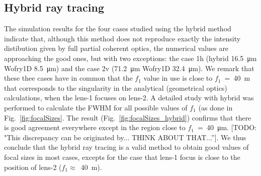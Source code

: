 \documentclass{iucr}              %
\newcommand{\todo}[1]{{\color{red}[TODO: "#1'']}}
\begin{document}
\subsection{Hybrid ray tracing}

The simulation results for the four cases studied using the hybrid method indicate that, although this method does not reproduce exactly the intensity distibution given by full partial coherent optics, the numerical values are approaching the good ones, but with two exceptions: the case 
1h (hybrid \SI{16.5}{\micro\meter} Wofry1D \SI{8.5}{\micro\meter}) and the case 
2v (\SI{71.2}{\micro\meter} Wofry1D \SI{32.4}{\micro\meter}). 
We remark that these thee cases have in common that the $f_1$ value in use is close to $f_1$~=~\SI{40}{\meter} that corresponds to the singularity in the analytical (geometrical optics) calculations, when the lens-1 focuses on lens-2. A detailed study with hybrid was performed to calculate the FWHM for all possible values of $f_1$ (as done in Fig.~\ref{fig:focalSizes}. The result (Fig.~\ref{fig:focalSizes_hybrid}) confirms that there is good agreement everywhere except in the region close to $f_1$~=~\SI{40}{\micro\meter}.  \todo{This discrepancy can be originated by... THINK ABOUT THAT...}. We thus conclude that the hybrid ray tracing is a valid method to obtain good values of focal sizes in most cases, excepts for the case that lens-1 focus is close to the position of lens-2 ($f_1 \approx $~\SI{40}{\meter}).
\end{document}
